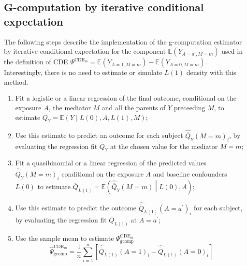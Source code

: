 \documentclass[
]{book}
\begin{document}
\hypertarget{g-computation-by-iterative-conditional-expectation}{%
\subsection{G-computation by iterative conditional expectation}\label{g-computation-by-iterative-conditional-expectation}}

The following steps describe the implementation of the g-computation estimator by iterative conditional expectation for the component \(\mathbb{E}(Y_{A=a^\prime,M=m})\) used in the definition of CDE \(\Psi^{\text{CDE}_m} = \mathbb{E}(Y_{A=1,M=m}) - \mathbb{E}(Y_{A=0,M=m})\). Interestingly, there is no need to estimate or simulate \(L(1)\) density with this method.

\begin{enumerate}
\def\labelenumi{\arabic{enumi}.}
\item
  Fit a logistic or a linear regression of the final outcome, conditional on the exposure \(A\), the mediator \(M\) and all the parents of \(Y\) preceeding \(M\), to estimate \(\overline{Q}_{Y} = \mathbb{E}(Y \mid L(0),A,L(1),M)\);
\item
  Use this estimate to predict an outcome for each subject \(\hat{\overline{Q}}_{Y}(M=m)_i\), by evaluating the regression fit \(\overline{Q}_{Y}\) at the chosen value for the mediator \(M=m\);
\item
  Fit a quasibinomial or a linear regression of the predicted values \(\hat{\overline{Q}}_{Y}(M=m)_i\) conditional on the exposure \(A\) and baseline confounders \(L(0)\) to estimate \(\overline{Q}_{L(1)} = \mathbb{E}\left(\hat{\overline{Q}}_{Y}(M=m) \middle| L(0),A\right)\);
\item
  Use this estimate to predict the outcome \(\hat{\overline{Q}}_{L(1)}(A=a^\prime)_i\) for each subject, by evaluating the regression fit \(\overline{Q}_{L(1)}\) at \(A=a^\prime\);
\item
  Use the sample mean to estimate \(\Psi^{\text{CDE}_m}_{\text{gcomp}}\)
  \begin{equation}
  \hat{\Psi}^{\text{CDE}_m}_{\text{gcomp}} = \frac{1}{n} \sum_{i=1}^n \left[ \hat{\overline{Q}}_{L(1)}(A=1)_i - \hat{\overline{Q}}_{L(1)}(A=0)_i \right]
  \end{equation}
\end{enumerate}
\end{document}
